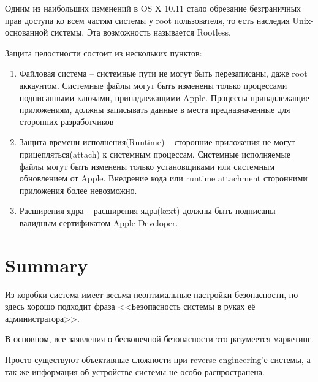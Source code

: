 \documentclass[12pt, a4paper]{article}
\begin{document}
Одним из наибольших изменений в OS X 10.11 стало обрезание безграничных прав доступа ко всем частям системы у root пользователя, то есть наследия Unix-основанной системы. Эта возможность называется Rootless.

Защита целостности состоит из нескольких пунктов:

\begin{enumerate}
  \item{Файловая система -- системные пути не могут быть перезаписаны, даже root аккаунтом. Системные файлы могут быть изменены только процессами подписанными ключами, принадлежащими Apple. Процессы принадлежащие приложениям, должны записывать данные в места предназначенные для сторонних разработчиков}
  \item{Защита времени исполнения(Runtime) -- сторонние приложения не могут прицепляться(attach) к системным процессам. Системные исполняемые файлы могут быть изменены только установщиками или системным обновлением от Apple. Внедрение кода или runtime attachment сторонними приложения более невозможно.}
  \item{Расширения ядра -- расширения ядра(kext) должны быть подписаны валидным сертификатом Apple Developer.}
\end{enumerate}

\section{Summary}

Из коробки система имеет весьма неоптимальные настройки безопасности, но здесь хорошо подходит фраза <<Безопасность системы в руках её администратора>>.

В основном, все заявления о бесконечной безопасности это разумеется маркетинг.

Просто существуют объективные сложности при reverse engineering'е системы, а так-же информация об устройстве системы не особо распространена.


\newpage
{}
% 

\makeatletter
\renewcommand{\@biblabel}[1]{#1}   %
\makeatother
\nocite{*}

\end{document}
